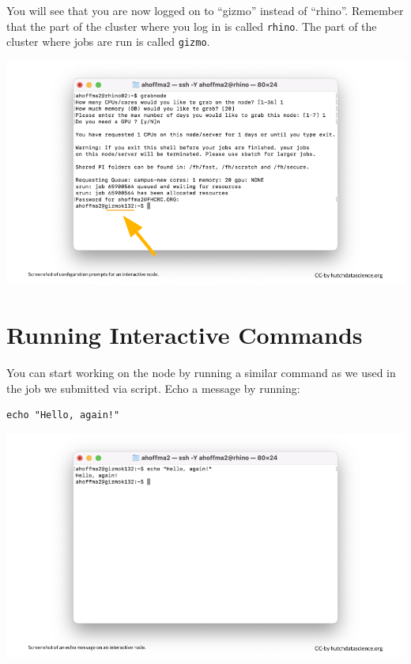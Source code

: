 \documentclass[
]{book}
\begin{document}
You will see that you are now logged on to ``gizmo'' instead of ``rhino''. Remember that the part of the cluster where you log in is called \texttt{rhino}. The part of the cluster where jobs are run is called \texttt{gizmo}.

\includegraphics[width=1\linewidth]{resources/images/07-interactive_files/figure-latex//1BQxrVYdKZTbpCaF-i_q9w7s9x034lEXpQZDU-Sl09cs_gff2211b72f_1_50}

\hypertarget{running-interactive-commands}{%
\section{Running Interactive Commands}\label{running-interactive-commands}}

You can start working on the node by running a similar command as we used in the job we submitted via script. Echo a message by running:

\begin{verbatim}
echo "Hello, again!"
\end{verbatim}

\includegraphics[width=1\linewidth]{resources/images/07-interactive_files/figure-latex//1BQxrVYdKZTbpCaF-i_q9w7s9x034lEXpQZDU-Sl09cs_gff2211b72f_1_58}
\end{document}

